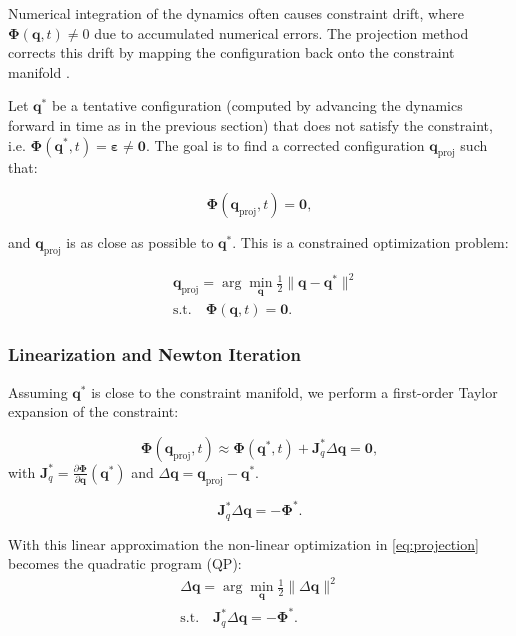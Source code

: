 \documentclass{article}
\newcommand{\mf}[1]{{\mathbf{#1}}}
\begin{document}
Numerical integration of the dynamics often causes constraint drift, where \(
\mf{\Phi}(\mf{q}, t) \neq 0 \) due to accumulated numerical errors. The
projection method corrects this drift by mapping the configuration back onto the
constraint manifold \cite{bib:cline2002rigid}.

Let \( \mf{q}^* \) be a tentative configuration (computed by advancing the
dynamics forward in time as in the previous section) that does not satisfy the
constraint, i.e. \( \mf{\Phi}(\mf{q}^*, t) = \mf{\varepsilon} \neq \mf{0} \).
The goal is to find a corrected configuration \( \mf{q}_{\text{proj}} \) such
that:

\begin{equation}
    \mf{\Phi}(\mf{q}_{\text{proj}}, t) = \mf{0},
\end{equation}

and \( \mf{q}_{\text{proj}} \) is as close as possible to \( \mf{q}^* \). This
is a constrained optimization problem:

\begin{eqnarray}
    &\mf{q}_{\text{proj}} = \arg\min_{\mf{q}} \frac{1}{2} \| \mf{q} - \mf{q}^* \|^2 \\
    &\text{s.t.} \quad \mf{\Phi}(\mf{q}, t) = \mf{0}.
    \label{eq:projection}
\end{eqnarray}

\subsubsection*{Linearization and Newton Iteration}

Assuming \( \mf{q}^* \) is close to the constraint manifold, we perform a
first-order Taylor expansion of the constraint:

\begin{equation}
    \mf{\Phi}(\mf{q}_{\text{proj}}, t) \approx \mf{\Phi}(\mf{q}^*, t) + \mf{J}_q^*\Delta
    \mf{q} = \mf{0},
\end{equation}
with $\mf{J}_q^*=\frac{\partial \mf{\Phi}}{\partial \mf{q}}(\mf{q}^*)$ and $\Delta
\mf{q} = \mf{q}_{\text{proj}} - \mf{q}^*$.

\begin{equation}
    \mf{J}_q^* \Delta \mf{q} = -\mf{\Phi}^*.
\end{equation}

With this linear approximation the non-linear optimization in
\eqref{eq:projection} becomes the quadratic program (QP):
\begin{eqnarray}
    \Delta\mf{q} = \arg\min_{\mf{q}} \frac{1}{2} \| \Delta\mf{q} \|^2 \\
    \text{s.t.} \quad \mf{J}_q^*\Delta\mf{q} = -\mf{\Phi}^*.
    \label{eq:linear_projection}
\end{eqnarray}
\end{document}

